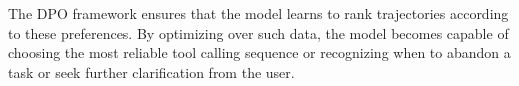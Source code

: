 The DPO framework ensures that the model learns to rank trajectories according to these preferences. By optimizing over such data, the model becomes capable of choosing the most reliable tool calling sequence or recognizing when to abandon a task or seek further clarification from the user.



 

